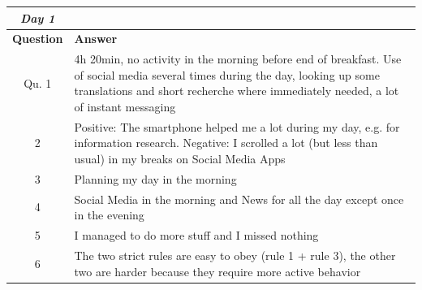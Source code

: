 \begin{table}[H]
	\centering
	
\begin{tabularx}{\textwidth}{cb}
\textbf{\textit{Day 1}} &    \\ \midrule[2pt]	
	\textbf{Question}&\textbf{Answer}\\ \toprule[1.3pt]	
	Qu. 1 & 4h 20min, no activity in the morning before end of breakfast. Use of social media several times during the day, looking up some translations and short recherche where immediately needed, a lot of instant messaging  \\ \midrule[0.5pt]
	2 & Positive: The smartphone helped me a lot during my day, e.g. for information research. Negative: I scrolled a lot (but less than usual) in my breaks on Social Media Apps \\ \midrule[0.5pt]
	3 & Planning my day in the morning\\ \midrule[0.5pt]
	4 & Social Media in the morning and News for all the day except once in the evening \\ \midrule[0.5pt]
	5 & I managed to do more stuff and I missed nothing \\ \midrule[0.5pt]
	6 & The two strict rules are easy to obey (rule 1 + rule 3), the other two are harder because they require more active behavior  \\ \bottomrule[1.3pt]
\end{tabularx}

\end{table}

